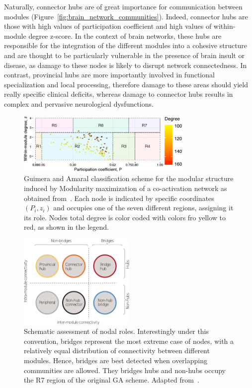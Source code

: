 Naturally, connector hubs are of great importance for communication between modules (Figure~\ref{fig:brain_network_communities}).
Indeed, connector hubs are those with high values of participation coefficient and high values of within-module degree z-score.
In the context of brain networks, these hubs are responsible for the integration of the different modules into a cohesive structure and are thought to be particularly vulnerable in the presence of brain insult or disease, as damage to these nodes is likely to disrupt network connectedness.
In contrast, provincial hubs are more importantly involved in functional specialization and local processing, therefore damage to these areas should yield really specific clinical deficits, whereas damage to connector hubs results in complex and pervasive neurological dysfunctions.


\begin{figure}[htb!]
\centering
\includegraphics[width=0.75\textwidth]{images/guimera_amaral_coact_q.pdf}
\caption{Guimera and Amaral classification scheme for the modular structure induced by Modularity maximization of a co-activation network as obtained from~\cite{crossley2013a}.
Each node is indicated by specific coordinates $(P_i,z_i)$ and occupies one of the seven different regions, assigning it its role.
Nodes total degree is color coded with colors fro yellow to red, as shown in the legend.}
\label{fig:gagraph}
\end{figure}

\begin{figure}[htb!]
\centering
\includegraphics[width=0.5\textwidth]{images/hubs_nonhubs.pdf}
\caption{Schematic assessment of nodal roles.
Interestingly under this convention, bridges represent the most extreme case of nodes, with a relatively equal distribution of connectivity between different modules.
Hence, bridges are best detected when overlapping communities are allowed.
They bridges hubs and non-hubs occupy the R7 region of the original GA scheme.
Adapted from~\cite{fornito2015}.}
\label{fig:hubs_bridges}
\end{figure}


